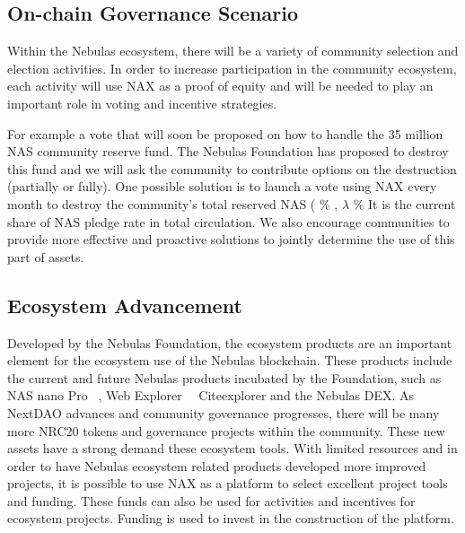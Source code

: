 \subsection{On-chain Governance Scenario}
Within the Nebulas ecosystem, there will be a variety of community selection and election activities. In order to increase participation in the community ecosystem, each activity will use NAX as a proof of equity and will be needed to play an important role in voting and incentive strategies.

For example a vote that will soon be proposed on how to handle the 35 million NAS community reserve fund. The Nebulas Foundation has proposed to destroy this fund and we will ask the community to contribute options on the destruction (partially or fully). One possible solution is to launch a vote using NAX every month to destroy the community's total reserved NAS (\lambda\) \% , \(\lambda\) \% It is the current share of NAS pledge rate in total circulation. We also encourage communities to provide more effective and proactive solutions to jointly determine the use of this part of assets.


\subsection{Ecosystem Advancement}
Developed by the Nebulas Foundation, the ecosystem products are an important element for the ecosystem use of the Nebulas blockchain. These products include the current and future Nebulas products incubated by the Foundation, such as NAS nano Pro ~\cite{NASnano}, Web Explorer ~\ Cite{explorer} and the Nebulas DEX. As NextDAO advances and community governance progresses, there will be many more NRC20 tokens and governance projects within the community. These new assets have a strong demand these ecosystem tools. With limited resources and in order to have Nebulas ecosystem related products developed more improved projects, it is possible to use NAX as a platform to select excellent project tools and funding. These funds can also be used for activities and incentives for ecosystem projects. Funding is used to invest in the construction of the platform.
